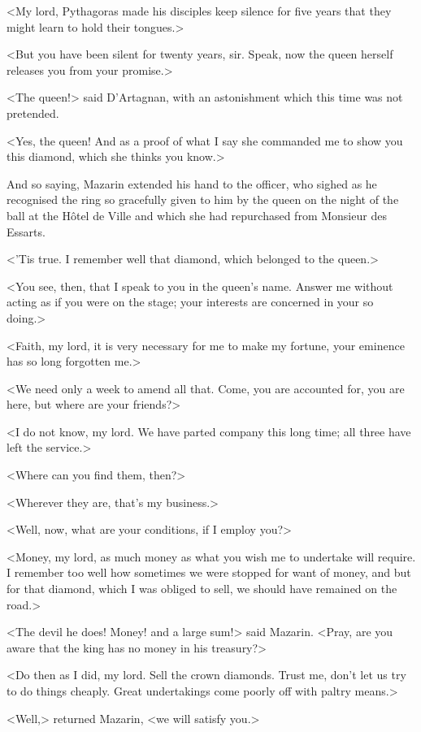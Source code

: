 <My lord, Pythagoras made his disciples keep silence for five years that they might learn to hold their tongues.>

<But you have been silent for twenty years, sir. Speak, now the queen herself releases you from your promise.>

<The queen!> said D'Artagnan, with an astonishment which this time was not pretended.

<Yes, the queen! And as a proof of what I say she commanded me to show you this diamond, which she thinks you know.>

And so saying, Mazarin extended his hand to the officer, who sighed as he recognised the ring so gracefully given to him by the queen on the night of the ball at the Hôtel de Ville and which she had repurchased from Monsieur des Essarts.

<'Tis true. I remember well that diamond, which belonged to the queen.>

<You see, then, that I speak to you in the queen's name. Answer me without acting as if you were on the stage; your interests are concerned in your so doing.>

<Faith, my lord, it is very necessary for me to make my fortune, your eminence has so long forgotten me.>

<We need only a week to amend all that. Come, you are accounted for, you are here, but where are your friends?>

<I do not know, my lord. We have parted company this long time; all three have left the service.>

<Where can you find them, then?>

<Wherever they are, that's my business.>

<Well, now, what are your conditions, if I employ you?>

<Money, my lord, as much money as what you wish me to undertake will require. I remember too well how sometimes we were stopped for want of money, and but for that diamond, which I was obliged to sell, we should have remained on the road.>

<The devil he does! Money! and a large sum!> said Mazarin. <Pray, are you aware that the king has no money in his treasury?>

<Do then as I did, my lord. Sell the crown diamonds. Trust me, don't let us try to do things cheaply. Great undertakings come poorly off with paltry means.>

<Well,> returned Mazarin, <we will satisfy you.>

